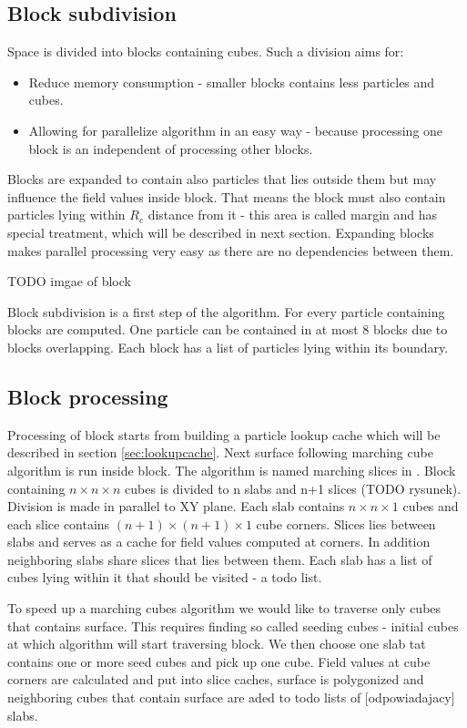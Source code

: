 \subsection{Block subdivision} \label{sec:block_subdivision}
Space is divided into blocks containing cubes. Such a division aims for:
\begin{itemize}
\item Reduce memory consumption - smaller blocks contains less particles and cubes. 
\item Allowing for parallelize algorithm in an easy way - because processing one block is an independent of processing other blocks. 
\end{itemize}
Blocks are expanded to contain also particles that lies outside them but may influence the field values inside block. That means the block must also contain particles lying within $R_c$ distance from it - this area is called margin and has special treatment, which will be described in next section. Expanding blocks makes parallel processing very easy as there are no dependencies between them.

TODO imgae of block

Block subdivision is a first step of the algorithm. For every particle containing blocks are computed. One particle can be contained in at most 8 blocks due to blocks overlapping. Each block has a list of particles lying within its boundary. 

\subsection{Block processing} \label{sec:block_processing}
Processing of block starts from building a particle lookup cache which will be described in section \ref{sec:lookupcache}. Next surface following marching cube algorithm is run inside block. The algorithm is named marching slices in \cite{RosenbergBirdwell2008}. Block containing $n \times n \times n$ cubes is divided to n slabs and n+1 slices (TODO rysunek). Division is made in parallel to XY plane. Each slab contains $n \times n \times 1$ cubes and each slice contains $(n+1) \times (n+1) \times 1$ cube corners. Slices lies between slabs and serves as a cache for field values computed at corners. In addition neighboring slabs share slices that lies between them. Each slab has a list of cubes lying within it that should be visited - a todo list.

To speed up a marching cubes algorithm we would like to traverse only cubes that contains surface. This requires finding so called seeding cubes - initial cubes at which algorithm will start traversing block. We then choose one slab tat contains one or more seed cubes and pick up one cube. Field values at cube corners are calculated and put into slice caches, surface is polygonized and neighboring cubes that contain surface are aded to todo lists of [odpowiadajacy] slabs. 

